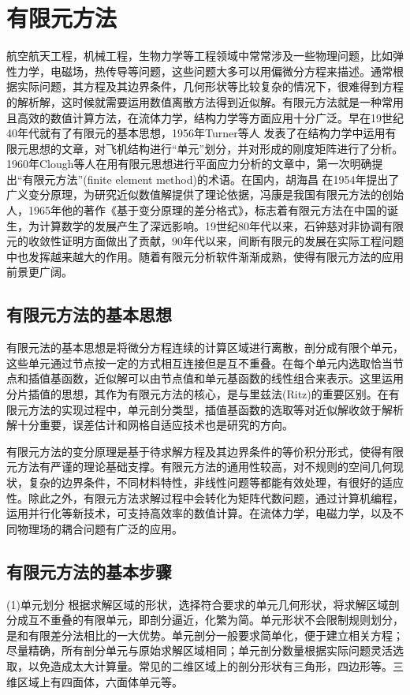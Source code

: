 \documentclass[twoside,UTF8]{nputhesis}
\begin{document}
\chapter{有限元方法}
航空航天工程，机械工程，生物力学\cite{FEM2010}等工程领域中常常涉及一些物理问题，比如弹性力学，电磁场，热传导等问题，这些问题大多可以用偏微分方程来描述。通常根据实际问题，其方程及其边界条件，几何形状等比较复杂的情况下，很难得到方程的解析解，这时候就需要运用数值离散方法得到近似解。有限元方法就是一种常用且高效的数值计算方法，在流体力学，结构力学等方面应用十分广泛\cite{begin1986}。早在19世纪40年代就有了有限元的基本思想\cite{Courant1943}，1956年Turner等人\cite{Turner1956} 发表了在结构力学中运用有限元思想的文章，对飞机结构进行“单元”划分，并对形成的刚度矩阵进行了分析。1960年Clough等人\cite{Clough1960}在用有限元思想进行平面应力分析的文章中，第一次明确提出“有限元方法”(finite element method)的术语。在国内，胡海昌\cite{Hu1954} 在1954年提出了广义变分原理，为研究近似数值解提供了理论依据，冯康是我国有限元方法的创始人，1965年他的著作\cite{Feng1965}《基于变分原理的差分格式》，标志着有限元方法在中国的诞生，为计算数学的发展产生了深远影响。19世纪80年代以来，石钟慈对非协调有限元的收敛性证明方面做出了贡献\cite{shi2000}，90年代以来，间断有限元的发展在实际工程问题中也发挥越来越大的作用\cite{Feng2001}。随着有限元分析软件渐渐成熟\cite{ANSYS2000}，使得有限元方法的应用前景更广阔。
\section{有限元方法的基本思想}
有限元法的基本思想是将微分方程连续的计算区域进行离散，剖分成有限个单元，这些单元通过节点按一定的方式相互连接但是互不重叠。在每个单元内选取恰当节点和插值基函数，近似解可以由节点值和单元基函数的线性组合来表示。这里运用分片插值的思想，其作为有限元方法的核心，是与里兹法(Ritz)的重要区别。在有限元方法的实现过程中，单元剖分类型，插值基函数的选取等对近似解收敛于解析解十分重要，误差估计和网格自适应技术也是研究的方向。

有限元方法的变分原理是基于待求解方程及其边界条件的等价积分形式，使得有限元方法有严谨的理论基础支撑。有限元方法的通用性较高，对不规则的空间几何现状，复杂的边界条件，不同材料特性，非线性问题等都能有效处理，有很好的适应性。除此之外，有限元方法求解过程中会转化为矩阵代数问题，通过计算机编程，运用并行化等新技术，可支持高效率的数值计算。在流体力学，电磁力学，以及不同物理场的耦合问题有广泛的应用。
\section{有限元方法的基本步骤}
(1)单元划分
根据求解区域的形状，选择符合要求的单元几何形状，将求解区域剖分成互不重叠的有限单元，即剖分逼近，化繁为简。单元形状不会限制规则划分，是和有限差分法相比的一大优势。单元剖分一般要求简单化，便于建立相关方程；尽量精确，所有剖分单元与原始求解区域相同；单元剖分数量根据实际问题灵活选取，以免造成太大计算量。常见的二维区域上的剖分形状有三角形，四边形等。三维区域上有四面体，六面体单元等。
\end{document}
